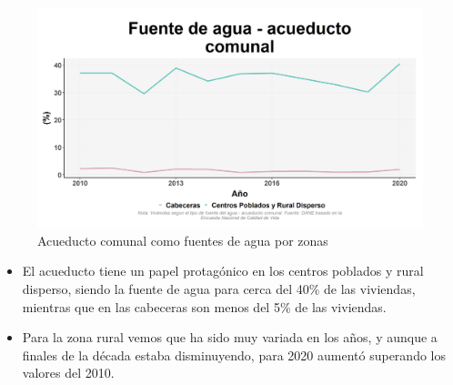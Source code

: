     \begin{figure}[H]
        \caption{Acueducto comunal como fuentes de agua por zonas \label{map_result_2} }
        \begin{center}
        \includegraphics[width=\textwidth,keepaspectratio]{img/var_134_trend.png}
        \end{center}
    \end{figure}
            \begin{itemize}
                    \item El acueducto tiene un papel protagónico en los centros poblados y rural disperso, siendo la fuente de agua para cerca del 40\% de las viviendas, mientras que en las cabeceras son menos del 5\% de las viviendas.
                    \item Para la zona rural vemos que ha sido muy variada en los años, y aunque a finales de la década estaba disminuyendo, para 2020 aumentó superando los valores del 2010.
                    \end{itemize}

